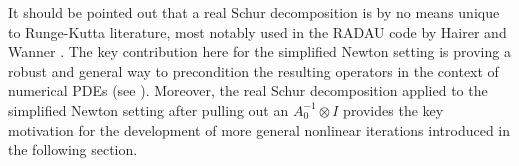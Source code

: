 \documentclass[review]{siamart}
\makeatletter
\newcommand{\todo}[1]{\textcolor{red}{[TODO\@: #1]}}
\makeatother
\begin{document}
%
\begin{remark}
It should be pointed out that a real Schur decomposition is by no means
unique to Runge-Kutta literature, most notably used in the RADAU code
by Hairer and Wanner \cite{hairer99}.
The key contribution here for the simplified Newton setting is proving a
robust and general way to precondition the resulting operators in the
context of numerical PDEs (see ). Moreover, the real
Schur decomposition applied to the simplified Newton setting after
pulling out an $A_0^{-1}\otimes I$ provides the key motivation for
the development of more general nonlinear iterations introduced in
the following section.
\end{remark}


%

\end{document}
